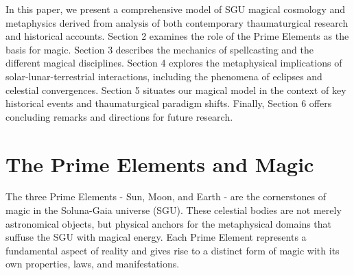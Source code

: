\documentclass[12pt]{article}
\begin{document}
In this paper, we present a comprehensive model of SGU magical cosmology and metaphysics derived from analysis of both contemporary thaumaturgical research and historical accounts. Section 2 examines the role of the Prime Elements as the basis for magic. Section 3 describes the mechanics of spellcasting and the different magical disciplines. Section 4 explores the metaphysical implications of solar-lunar-terrestrial interactions, including the phenomena of eclipses and celestial convergences. Section 5 situates our magical model in the context of key historical events and thaumaturgical paradigm shifts. Finally, Section 6 offers concluding remarks and directions for future research.

\section{The Prime Elements and Magic}

The three Prime Elements - Sun, Moon, and Earth - are the cornerstones of magic in the Soluna-Gaia universe (SGU). These celestial bodies are not merely astronomical objects, but physical anchors for the metaphysical domains that suffuse the SGU with magical energy. Each Prime Element represents a fundamental aspect of reality and gives rise to a distinct form of magic with its own properties, laws, and manifestations.
\end{document}
